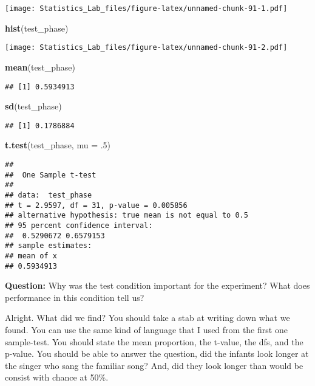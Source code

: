 \documentclass[
]{book}
\newenvironment{Shaded}{\begin{snugshade}}{\end{snugshade}}
\newcommand{\AttributeTok}[1]{\textcolor[rgb]{0.13,0.29,0.53}{#1}}
\newcommand{\DecValTok}[1]{\textcolor[rgb]{0.00,0.00,0.81}{#1}}
\newcommand{\FunctionTok}[1]{\textcolor[rgb]{0.13,0.29,0.53}{\textbf{#1}}}
\newcommand{\NormalTok}[1]{#1}
\begin{document}
\texttt{[image: Statistics\_Lab\_files/figure-latex/unnamed-chunk-91-1.pdf]}

\begin{Shaded}
\begin{Highlighting}[]
\FunctionTok{hist}\NormalTok{(test\_phase)}
\end{Highlighting}
\end{Shaded}

\texttt{[image: Statistics\_Lab\_files/figure-latex/unnamed-chunk-91-2.pdf]}

\begin{Shaded}
\begin{Highlighting}[]
\FunctionTok{mean}\NormalTok{(test\_phase)}
\end{Highlighting}
\end{Shaded}

\begin{verbatim}
## [1] 0.5934913
\end{verbatim}

\begin{Shaded}
\begin{Highlighting}[]
\FunctionTok{sd}\NormalTok{(test\_phase)}
\end{Highlighting}
\end{Shaded}

\begin{verbatim}
## [1] 0.1786884
\end{verbatim}

\begin{Shaded}
\begin{Highlighting}[]
\FunctionTok{t.test}\NormalTok{(test\_phase, }\AttributeTok{mu =}\NormalTok{ .}\DecValTok{5}\NormalTok{)}
\end{Highlighting}
\end{Shaded}

\begin{verbatim}
## 
##  One Sample t-test
## 
## data:  test_phase
## t = 2.9597, df = 31, p-value = 0.005856
## alternative hypothesis: true mean is not equal to 0.5
## 95 percent confidence interval:
##  0.5290672 0.6579153
## sample estimates:
## mean of x 
## 0.5934913
\end{verbatim}

\textbf{Question:} Why was the test condition important for the experiment? What does performance in this condition tell us?

Alright. What did we find? You should take a stab at writing down what we found. You can use the same kind of language that I used from the first one sample-test. You should state the mean proportion, the t-value, the dfs, and the p-value. You should be able to answer the question, did the infants look longer at the singer who sang the familiar song? And, did they look longer than would be consist with chance at 50\%.
\end{document}
